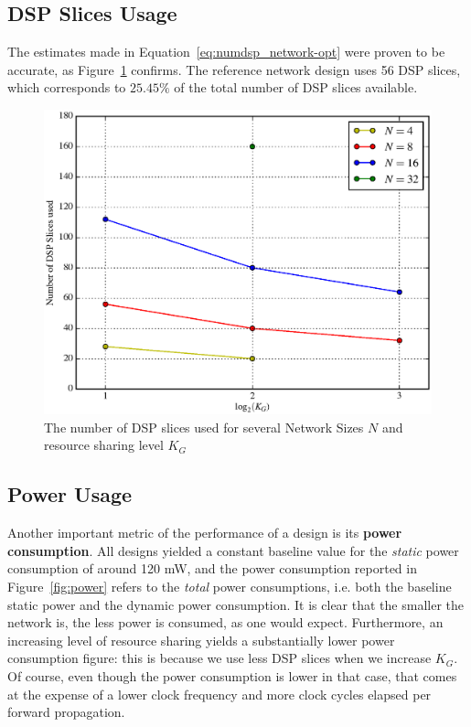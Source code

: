 \subsection{DSP Slices Usage}\label{sec:res-synth-dsp}
The estimates made in Equation~\ref{eq:numdsp_network-opt} were proven to be accurate, as Figure~\ref{fig:dspused} confirms. The reference network design uses 56 DSP slices, which corresponds to $25.45\%$ of the total number of DSP slices available.
\begin{figure}
    \centering
    \includegraphics[width=\linewidth]{figures/dspuse.eps}
    \caption[The number of DSP slices used for several Network Sizes $N$ and resource sharing level $K_G$]{The number of DSP slices used for several Network Sizes $N$ and resource sharing level $K_G$}
    \label{fig:dspused}
\end{figure}

\subsection{Power Usage}\label{sec:res-synth-power}
Another important metric of the performance of a design is its \textbf{power consumption}. All designs yielded a constant baseline value for the \emph{static} power consumption of around 120 mW, and the power consumption reported in Figure~\ref{fig:power} refers to the \emph{total} power consumptions, i.e. both the baseline static power and the dynamic power consumption. It is clear that the smaller the network is, the less power is consumed, as one would expect. Furthermore, an increasing level of resource sharing yields a substantially lower power consumption figure: this is because we use less DSP slices when we increase $K_G$. Of course, even though the power consumption is lower in that case, that comes at the expense of a lower clock frequency and more clock cycles elapsed per forward propagation.

